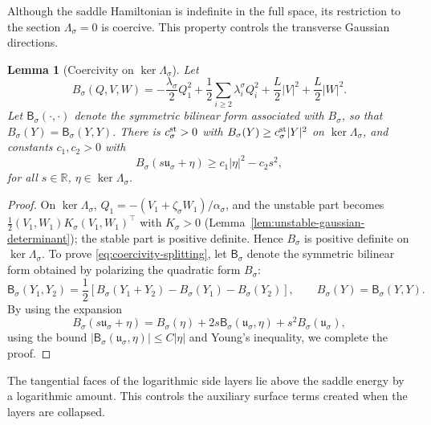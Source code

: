 \documentclass[11pt]{article}
\numberwithin{equation}{section}
\theoremstyle{plain}
\newtheorem{lemma}[theorem]{Lemma}
\theoremstyle{definition}
\theoremstyle{remark}
\newcommand{\R}{\mathbb R}
\begin{document}
Although the saddle Hamiltonian is indefinite in the full
space, its restriction to the section $\Lambda_\sigma=0$ is coercive.  This
property controls the transverse Gaussian directions.

\begin{lemma}[Coercivity on $\ker\Lambda_\sigma$]
\label{lem:coercivity-ker-Lambda}
Let
\[
B_\sigma(Q,V,W)=-\frac{\lambda_\sigma}{2}Q_1^2+\frac12\sum_{i\ge2}\lambda_i^\sigma Q_i^2+\frac L2|V|^2+\frac L2|W|^2.
\]
Let $\mathsf B_\sigma(\cdot,\cdot)$ denote the symmetric bilinear
form associated with $B_\sigma$, so that
$B_\sigma(Y)=\mathsf B_\sigma(Y,Y)$.
There is $c_\sigma^{\rm st}>0$ with $B_\sigma(Y)\ge c_\sigma^{\rm st}|Y|^2$ on
$\ker\Lambda_\sigma$, and constants $c_1,c_2>0$ with
\begin{equation}
\label{eq:coercivity-splitting}
B_\sigma(s\mathfrak u_\sigma+\eta)\ge c_1|\eta|^2-c_2s^2,
\end{equation}
for all $s\in\R$,
$\eta\in\ker\Lambda_\sigma$.
\end{lemma}

\begin{proof}
On $\ker\Lambda_\sigma$, $Q_1=-(V_1+\zeta_\sigma W_1)/\alpha_\sigma$, and the
unstable part becomes $\frac12(V_1,W_1)K_\sigma(V_1,W_1)^\top$ with
$K_\sigma>0$ (Lemma~\ref{lem:unstable-gaussian-determinant}); the stable part is
positive definite.  Hence $B_\sigma$ is positive definite on
$\ker\Lambda_\sigma$.  To prove
\eqref{eq:coercivity-splitting},  
let $\mathsf B_\sigma$ denote the symmetric bilinear form obtained by
polarizing the quadratic form $B_\sigma$:
\[
\mathsf B_\sigma(Y_1,Y_2)
=\frac12\left[B_\sigma(Y_1+Y_2)-B_\sigma(Y_1)-B_\sigma(Y_2)\right],
\qquad B_\sigma(Y)=\mathsf B_\sigma(Y,Y).
\]
By using the expansion
\[
B_\sigma(s\mathfrak u_\sigma+\eta)=B_\sigma(\eta)+2s\mathsf B_\sigma(\mathfrak u_\sigma,\eta)+s^2B_\sigma(\mathfrak u_\sigma),
\]
using the bound $|\mathsf B_\sigma(\mathfrak u_\sigma,\eta)|\le C|\eta|$ and Young's inequality, we complete the proof.
\end{proof}

The tangential faces of the logarithmic side layers lie above the saddle
energy by a logarithmic amount.  This controls the auxiliary surface terms
created when the layers are collapsed.
\end{document}
